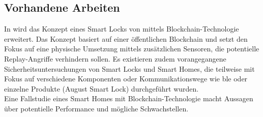     \subsection{Vorhandene Arbeiten}
    \label{sec:problem_relatedWork}
        In \cite{Han2017} wird das Konzept eines Smart Locks von \cite{Park2009} mittels Blockchain-Technologie erweitert.
        Das Konzept basiert auf einer öffentlichen Blockchain und setzt den Fokus auf eine physische Umsetzung mittels zusätzlichen Sensoren, die potentielle Replay-Angriffe verhindern sollen.
        \newpage
        \indent Es existieren zudem vorangegangene Sicherheitsuntersuchungen von Smart Locks \cite{Ho2016,Ye2017} und Smart Homes\cite{Fernandes2016}, die teilweise mit Fokus auf verschiedene Komponenten oder Kommunikationswege wie \gls{ble}\cite{Rose2016} oder einzelne Produkte (August Smart Lock\cite{Fuller2017}) durchgeführt wurden.
        \medskip\\
        Eine Fallstudie eines Smart Homes mit Blockchain-Technologie\cite{Dorri2017} macht Aussagen über potentielle Performance und mögliche Schwachstellen.
